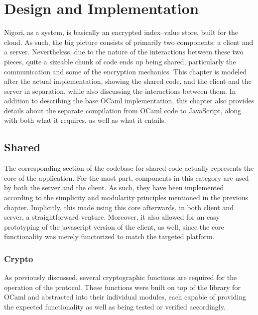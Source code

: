 \chapter{Design and Implementation} \label{chapter:implementation}
Nigori, as a system, is basically an encrypted index--value store, built for the cloud.
As such, the big picture consists of primarily two components: a client and a server.
Nevertheless, due to the nature of the interactions between these two pieces, quite a sizeable chunk of code ends up being shared, particularly the communication and some of the encryption mechanics.
This chapter is modeled after the actual implementation, showing the shared code, and the client and the server in separation, while also discussing the interactions between them.
In addition to describing the base OCaml implementation, this chapter also provides details about the separate compilation from OCaml code to JavaScript, along with both what it requires, as well as what it entails.

\section{Shared}
The corresponding section of the codebase for shared code actually represents the core of the application.
For the most part, components in this category are used by both the server and the client.
As such, they have been implemented according to the simplicity and modularity principles mentioned in the previous chapter.
Implicitly, this made using this core afterwards, in both client and server, a straightforward venture.
Moreover, it also allowed for an easy prototyping of the javascript version of the client, as well, since the core functionality was merely functorized to match the targeted platform.

\subsection{Crypto}
 As previously discussed, several cryptographic functions are required for the operation of the protocol.
These functions were built on top of the  library for OCaml and abstracted into their individual modules, each capable of providing the expected functionality as well as being tested or verified accordingly.

